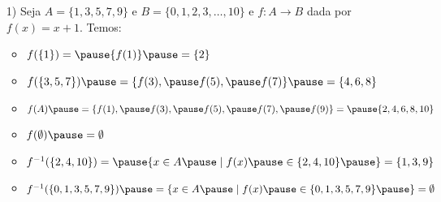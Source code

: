 \documentclass{beamer}
\begin{document}
    \begin{frame}
        \begin{exemplos}
            \begin{enumerate}
                \item[1)] Seja $A = \{1, 3, 5, 7, 9 \}$ \pause e $B = \{0, 1, 2, 3, \dots, 10\}$ \pause e $f : A \to B$ \pause dada por $f(x) = x + 1$. \pause Temos:\pause

                \vspace{.5cm}

                \begin{itemize}
                    \item $f(\{1\}) = \pause \{f(1)\} \pause= \{2\}$\pause

                    \vspace{.5cm}

                    \item $f(\{3, 5, 7\}) \pause= \{f(3), \pause f(5), \pause f(7)\} \pause = \{4, 6, 8\}$\pause

                    \vspace{.5cm}

                    \item $f(A) \pause = \{f(1), \pause f(3), \pause f(5), \pause f(7), \pause f(9)\} = \pause \{2, 4, 6, 8, 10\}$\pause

                    \vspace{.5cm}

                    \item $f(\emptyset) \pause = \emptyset$\pause

                    \vspace{.5cm}

                    \item $f^{-1}(\{2, 4, 10\}) = \pause \{x \in A \pause \mid f(x) \pause \in \{2, 4, 10\}\pause\} = \{1, 3, 9\}$\pause

                    \vspace{.5cm}

                    \item $f^{-1}(\{0, 1, 3, 5, 7, 9\}) \pause = \{x \in A \pause \mid f(x) \pause \in \{0, 1, 3, 5, 7, 9\}\pause\} = \emptyset$\pause

                    \vspace{.5cm}
                \end{itemize}
            \end{enumerate}
        \end{exemplos}
    \end{frame}
\end{document}
